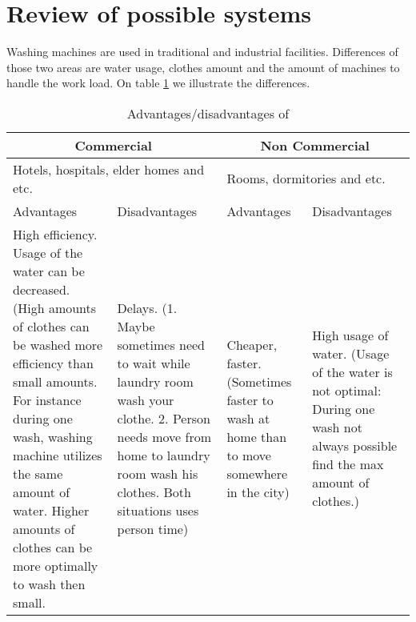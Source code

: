\section{Review of possible systems}
Washing machines are used in traditional and industrial facilities. Differences of those two areas are water usage, clothes amount and the amount of machines to handle the work load. On table \ref{tab:AdDis} we illustrate the differences.

\begin{table}[h]
	\centering
    \begin{tabular}{ | p{3.5cm} | p{3.5cm} | p{3.5cm} | p{3.5cm} |}
    \hline
    \multicolumn{2}{|c|}{\textbf{Commercial}} & \multicolumn{2}{|c|}{\textbf{Non Commercial}} \\ \hline
    \multicolumn{2}{|l|}{Hotels, hospitals, elder homes and etc.} & \multicolumn{2}{|l|}{Rooms, dormitories and etc.} \\ \hline
    Advantages & Disadvantages & Advantages & Disadvantages \\ \hline
    High efficiency. Usage of the water can be decreased. (High amounts of clothes can be washed more efficiency than small amounts. For instance during one wash, washing machine utilizes the same amount of water. Higher amounts of clothes can be more optimally to wash then small. & Delays. (1. Maybe sometimes need to wait while laundry room wash your clothe. 2. Person needs move from home to laundry room wash his clothes. Both situations uses person time) & Cheaper, faster. (Sometimes faster to wash at home than to move somewhere in the city) & High usage of water. (Usage of the water is not optimal: During one wash not always possible find the max amount of clothes.) \\ \hline
    \end{tabular}
	\caption{Advantages/disadvantages of }
	\label{tab:AdDis}
\end{table}